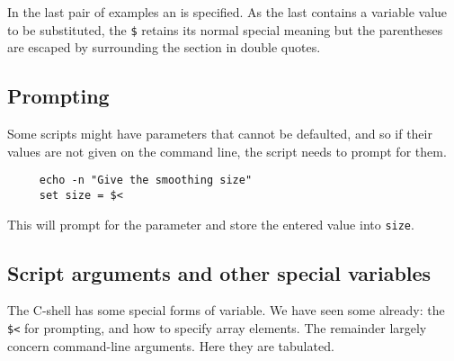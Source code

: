 In the last pair of examples an 
is specified.  As the last contains a variable value to be
substituted, the {\tt \$} retains its normal special meaning but the
parentheses are escaped by surrounding the section in double quotes.

\newpage
\subsection{Prompting\label{sc4_se_prompting}}

Some scripts might have parameters that cannot be defaulted, and so
if their values are not given on the command line, the script
needs to prompt for them.

\small
\begin{verbatim}
     echo -n "Give the smoothing size"
     set size = $<
\end{verbatim}
\normalsize
This will prompt for the parameter and store the entered value into
 {\tt size}.

\subsection{Script arguments and other special
variables\label{sc4_se_arguments}}

The C-shell has some special forms of variable.  We have seen some
already: the {\tt \$<} for prompting, and how to specify array
elements.  The remainder largely concern command-line arguments.
Here they are tabulated.


